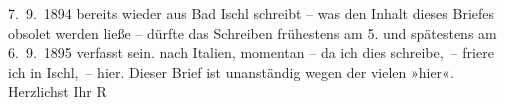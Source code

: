 \begin{ledgroupsized}[t]{13cm}
{{{                     7. 9. 1894 bereits wieder aus Bad Ischl
                   schreibt – was den Inhalt dieses Briefes obsolet werden
                  ließe – dürfte das Schreiben frühestens am 5. und spätestens am
                     6. 9. 1895 verfasst sein.}}}\label{K_L00366_1h} nach Italien, momentan – {\pb}da ich dies schreibe, – friere
               ich in Ischl, – hier. Dieser Brief ist
               unanständig wegen der vielen »hier«.\pend
           \pstart Herzlichst Ihr \spacefill\mbox{R}\pend{}\endnumbering{}\end{ledgroupsized}  \newcommand{\dateiname}{L00366}\newcommand{\titel}{Richard Beer-Hofmann an Arthur Schnitzler, [5./6.? 9. 1894]}\newcommand{\editorInnen}{Martin Anton Müller und Gerd-Hermann Susen}
      